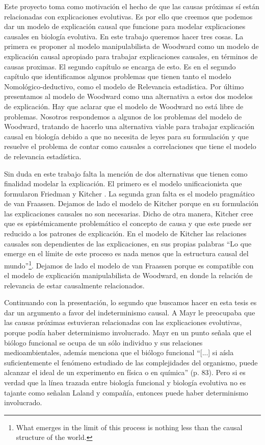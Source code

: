 Este proyecto toma como motivación el hecho de que las causas próximas sí están relacionadas con explicaciones evolutivas. Es por ello que creemos que podemos dar un modelo de explicación causal que funcione para modelar explicaciones causales en biología evolutiva. En este trabajo queremos hacer tres cosas. La primera es proponer al modelo manipulabilista de Woodward  \cite{Woodward2000, Woodward2003} como un modelo de explicación causal apropiado para trabajar explicaciones causales, en términos de causas proximas. El segundo capítulo se encarga de esto. Es en el segundo capítulo que identificamos algunos problemas que tienen tanto el modelo Nomológico-deductivo, como el modelo de Relevancia estadística. Por último presentamos al modelo de Woodward como una alternativa a estos dos modelos de explicación. Hay que aclarar que el modelo de Woodward no está libre de problemas. Nosotros respondemos a algunos de los problemas del modelo de Woodward, tratando de hacerlo una alternativa viable para trabajar explicación causal en biología debido a que no necesita de leyes para su formulación y que resuelve el problema de contar como causales a correlaciones que tiene el modelo de relevancia estadística.

Sin duda en este trabajo falta la mención de dos alternativas que tienen como finalidad modelar la explicación. El primero es el modelo unificacionista que formularon Friedman \citeyear{Friedman1974} y Kitcher \cite{Kitcher2002}. La segunda gran falta es el modelo pragmático de van Fraassen. Dejamos de lado el modelo de Kitcher porque en su formulación las explicaciones causales no son necesarias. Dicho de otra manera, Kitcher cree que es epistémicamente problemático el concepto de causa y que este puede ser reducido a los patrones de explicación. En el modelo de Kitcher las relaciones causales son dependientes de las explicaciones, en sus propias palabras ``Lo que emerge en el límite de este proceso es nada menos que la estructura causal del mundo''\footnote{What emerges in the limit of this process is nothing less than the causal structure of the world.}. Dejamos de lado el modelo de van Fraassen porque es compatible con el modelo de explicación manipulabilista de Woodward, en donde la relación de relevancia de estar causalmente relacionados.

Continuando con la presentación, lo segundo que buscamos hacer en esta tesis es dar un argumento a favor del indeterminismo causal. A Mayr le preocupaba que las causas próximas estuvieran relacionadas con las explicaciones evolutivas, porque podía haber determinismo involucrado. Mayr \cite{Mayr1998} en un punto señala que el biólogo funcional se ocupa de un sólo individuo y sus relaciones medioambientales, además menciona que el biólogo funcional ``[...] si aísla suficientemente el fenómeno estudiado de las complejidades del organismo, puede alcanzar el ideal de un experimento en física o en química'' (p. 83). Pero si es verdad que la línea trazada entre biología funcional y biología evolutiva no es tajante como señalan Laland y compañía, entonces puede haber determinismo involucrado.

